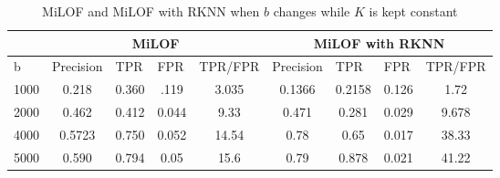 \begin{table}[H]
	\centering
	\caption{MiLOF and MiLOF with RKNN when $b$ changes while $K$ is kept constant}
	\label{my-label}
	\begin{tabular}{|l|c|c|c|c|c|c|c|c|}
		\hline
		& \multicolumn{4}{c|}{MiLOF}                                                                                                    & \multicolumn{4}{c|}{MiLOF with RKNN}                                                                                          \\ \hline
		b                          & \multicolumn{1}{l|}{Precision} & \multicolumn{1}{l|}{TPR} & \multicolumn{1}{l|}{FPR} & \multicolumn{1}{l|}{TPR/FPR} & \multicolumn{1}{l|}{Precision} & \multicolumn{1}{l|}{TPR} & \multicolumn{1}{l|}{FPR} & \multicolumn{1}{l|}{TPR/FPR} \\ \hline
		1000                       & 0.218                          & 0.360                              & .119                     & 3.035                        & 0.1366                         & 0.2158                             & 0.126                    & 1.72                         \\ \hline
		\multicolumn{1}{|c|}{2000} & 0.462                          & 0.412                              & 0.044                    & 9.33                         & 0.471                          & 0.281                              & 0.029                    & 9.678                        \\ \hline
		\multicolumn{1}{|c|}{4000} & 0.5723                         & 0.750                              & 0.052                    & 14.54                        & 0.78                           & 0.65                               & 0.017                    & 38.33                        \\ \hline
		\multicolumn{1}{|c|}{5000} & 0.590                          & 0.794                              & 0.05                     & 15.6                         & 0.79                           & 0.878                              & 0.021                    & 41.22                        \\ \hline
	\end{tabular}
\end{table}

